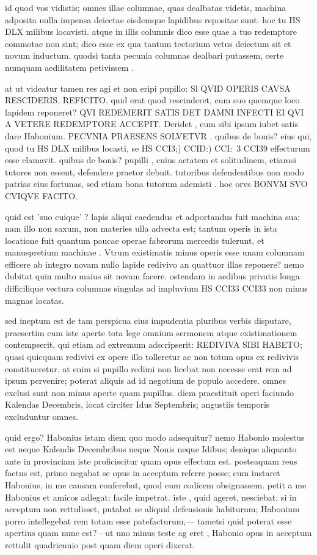  id quod vos vidistis; omnes illae columnae, quas dealbatas videtis, machina adposita nulla impensa deiectae eisdemque lapidibus repositae sunt. hoc tu HS DLX milibus locavisti. atque in illis columnis dico esse quae a tuo redemptore commotae non sint; dico esse ex qua tantum tectorium vetus deiectum sit et novum inductum. quodsi tanta pecunia columnas dealbari putassem, certe numquam aedilitatem petivissem .

 at ut videatur tamen res agi et non eripi pupillo: Sl QVID OPERIS CAVSA RESCIDERIS, REFICITO. quid erat quod rescinderet, cum suo quemque loco lapidem reponeret? QVI REDEMERIT SATIS DET DAMNI INFECTI EI QVI A VETERE REDEMPTORE ACCEPIT. Deridet , cum sibi ipsum iubet satis dare Habonium. PECVNIA PRAESENS SOLVETVR . quibus de bonis? eius qui, quod tu HS DLX milibus locasti, se HS CCI3;) CCID:) CCI:~3 CCI39 effecturum esse clamavit. quibus de bonis? pupilli , cuius aetatem et solitudinem, etiamsi tutores non essent, defendere praetor debuit. tutoribus defendentibus non modo patrias eius fortunas, sed etiam bona tutorum ademisti . hoc orvs BONVM SVO CVIQVE FACITO.

 quid est 'suo cuique' ? lapis aliqui caedendus et adportandus fuit machina sua; nam illo non saxum, non materies ulla advecta est; tantum operis in ista locatione fuit quantum paucae operae fabrorum mercedis tulerunt, et manuspretium machinae . Vtrum existimatis minus operis esse unam columnam efficere ab integro novam nullo lapide redivivo an quattuor illas reponere? nemo dubitat quin multo maius sit novam facere. ostendam in aedibus privatis longa difficilique vectura columnas singulas ad impluvium HS CCI33 CCI33 non minus magnas locatas.

 sed ineptum est de tam perspicua eius impudentia pluribus verbis disputare, praesertim cum iste aperte tota lege omnium sermonem atque existimationem contempserit, qui etiam ad extremum adscripserit: REDIVIVA SIBI HABETO; quasi quicquam redivivi ex opere illo tolleretur ac non totum opus ex redivivis constitueretur. at enim si pupillo redimi non licebat non necesse erat rem ad ipsum pervenire; poterat aliquis ad id negotium de populo accedere. omnes exclusi sunt non minus aperte quam pupillus. diem praestituit operi faciundo Kalendas Decembris, locat circiter Idus Septembris; angustiis temporis excluduntur omnes.

 quid ergo? Habonius istam diem quo modo adsequitur? nemo Habonio molestus est neque Kalendis Decembribus neque Nonis neque Idibus; denique aliquanto ante in provinciam iste proficiscitur quam opus effectum est. posteaquam reus factus est, primo negabat se opus in acceptum referre posse; cum instaret Habonius, in me causam conferebat, quod eum codicem obsignassem. petit a me Habonius et amicos adlegat: facile impetrat. iste , quid ageret, nesciebat; si in acceptum non rettulisset, putabat se aliquid defensionis habiturum; Habonium porro intellegebat rem totam esse patefacturum,— tametsi quid poterat esse apertius quam nunc est?—ut uno minus teste ag eret , Habonio opus in acceptum rettulit quadriennio post quam diem operi dixerat.

